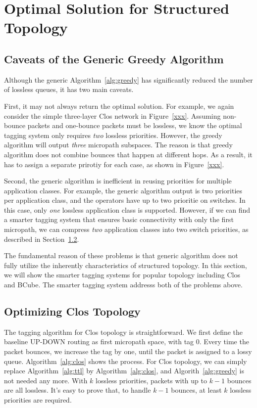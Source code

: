 \section{Optimal Solution for Structured Topology}\label{sec:specific}

\subsection{Caveats of the Generic Greedy Algorithm}\label{sec:caveats}

Although the generic Algorithm~\ref{alg:greedy} has significantly reduced the number of lossless queues,
it has two main caveats.

First, it may not always return the optimal solution. For example, we again consider the simple three-layer
Clos network in Figure~\ref{xxx}. Assuming non-bounce packets and one-bounce packets must be lossless,  
we know the optimal tagging system only requires {\em two} lossless priorities. However, the 
greedy algorithm will output {\em three} micropath subspaces. The reason is that greedy algorithm does
not combine bounces that happen at different hops. As a result, it has to assign a separate prirotiy
for each case, as shown in Figure~\ref{xxx}.

Second, the generic algorithm is inefficient in reusing priorities for multiple application classes.
For example, the generic algorithm output is two priorities per application class, and the operators
have up to two prioritie on switches. In this case, only {\em one} lossless application
class is supported. However, if we can find a smarter tagging system that ensures basic connectivity 
with only the first micropath, we can compress {\em two} application classes into two switch priorities, 
as described in Section~\ref{sec:clos}.

The fundamental reason of these problems is that generic algorithm does not fully utilize the inherently characteristics of structured topology. In this section, we will show the smarter tagging systems for popular topology including Clos and BCube. The smarter tagging system addresss both of the problems above.


\subsection{Optimizing Clos Topology}\label{sec:clos}

The tagging algorithm for Clos topology is straightforward. 
We first define the baseline UP-DOWN routing as first micropath space, with tag 0. Every time the packet
bounces, we increase the tag by one, until the packet is assigned to a lossy queue. Algorithm~\ref{alg:clos}
shows the process. For Clos topology, we can simply replace Algorithm~\ref{alg:ttl} by 
Algorithm~\ref{alg:clos}, and Algorith~\ref{alg:greedy} is not needed any more.
With $k$ lossless priorities, packets with up to $k-1$ bounces are all lossless.
It's easy to prove that, to handle $k-1$ bounces, at least $k$ lossless priorities are required.


